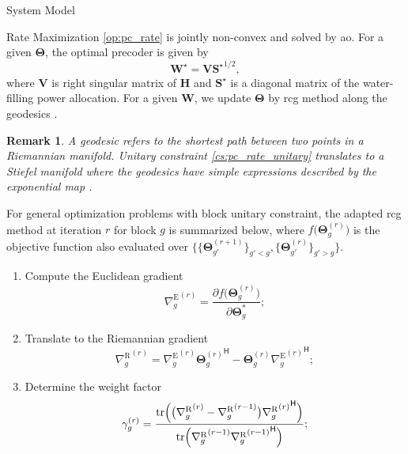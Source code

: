 \documentclass[journal]{IEEEtran}
\newtheorem{remark}{Remark}
\begin{document}
\begin{section}{System Model}
\begin{subsection}{Rate Maximization}
		\eqref{op:pc_rate} is jointly non-convex and solved by \gls{ao}.
		For a given $\mathbf{\Theta}$, the optimal precoder is given by
		\begin{equation}
			\mathbf{W}^\star = \mathbf{V} {\mathbf{S}^\star}^{1/2},
		\end{equation}
		where $\mathbf{V}$ is right singular matrix of $\mathbf{H}$ and $\mathbf{S}^\star$ is a diagonal matrix of the water-filling power allocation.
		For a given $\mathbf{W}$, we update $\mathbf{\Theta}$ by \gls{rcg} method along the geodesics \cite{Abrudan2009}.
		\begin{remark}
			A geodesic refers to the shortest path between two points in a Riemannian manifold.
			Unitary constraint \eqref{cs:pc_rate_unitary} translates to a Stiefel manifold where the geodesics have simple expressions described by the exponential map \cite{Abrudan2008}.
		\end{remark}
		For general optimization problems with block unitary constraint, the adapted \gls{rcg} method at iteration $r$ for block $g$ is summarized below, where $f\bigl(\mathbf{\Theta}_g^{(r)}\bigr)$ is the objective function also evaluated over $\bigl\{ \{\mathbf{\Theta}_{g'}^{(r+1)}\}_{g'<g}, \{\mathbf{\Theta}_{g'}^{(r)}\}_{g'>g} \bigr\}$.
		\begin{enumerate}
			\item Compute the Euclidean gradient
			\begin{equation}
				{\nabla_g^\mathrm{E}}^{(r)} = \frac{\partial f\bigl(\mathbf{\Theta}_g^{(r)}\bigr)}{\partial \mathbf{\Theta}_g^*};
				\label{eq:rcg_gradient_euclidean}
			\end{equation}
			\item Translate to the Riemannian gradient
			\begin{equation}
				{\nabla_g^\mathrm{R}}^{(r)} = {\nabla_g^\mathrm{E}}^{(r)} {\mathbf{\Theta}_g^{(r)}}^\mathsf{H} - \mathbf{\Theta}_g^{(r)} {{\nabla_g^\mathrm{E}}^{(r)}}^\mathsf{H};
				\label{eq:rcg_gradient_riemannian}
			\end{equation}
			\item Determine the weight factor
			\begin{equation}
				\gamma_g^{(r)} = \frac{\mathrm{tr}\Bigl(\bigl({\nabla_g^\mathrm{R}}^{(r)} - {\nabla_g^\mathrm{R}}^{(r-1)}\bigr) {{\nabla_g^\mathrm{R}}^{(r)}}^\mathsf{H}\Bigr)}{\mathrm{tr}\Bigl({\nabla_g^\mathrm{R}}^{(r-1)} {{\nabla_g^\mathrm{R}}^{(r-1)}}^\mathsf{H}\Bigr)};

\end{equation}
\end{enumerate}
\end{subsection}
\end{section}
\end{document}
